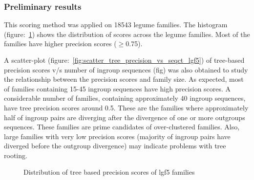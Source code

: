 \documentclass{article}
\begin{document}
		\subsubsection{Preliminary results}
		This scoring method was applied on 18543 legume families. The histogram (figure:~\ref{fig:hist_tree_precision_scores_lgf5}) shows the distribution of scores across the legume families. Most of the families have higher precision scores ($\geq$0.75).
		
		A scatter-plot (figure:~\ref{fig:scatter_tree_precision_vs_seqct_lgf5}) of tree-based precision scores v/s number of ingroup sequences (fig) was also obtained to study the relationship between the precision scores and family size. As expected, most of families containing 15-45 ingroup sequences  have high precision scores. A considerable number of families, containing approximately 40 ingroup sequences, have tree precision scores around 0.5. These are the families where approximately half of ingroup pairs are diverging after the divergence of one or more outgroups sequences. These families are prime candidates of over-clustered families. Also, large families with very low precision scores (majority of ingroup pairs have diverged before the outgroup divergence) may indicate problems with tree rooting.
		
		\begin{figure}[h!]
			\caption{Distribution of tree based precision scores of lgf5 families}
			\label{fig:hist_tree_precision_scores_lgf5}
		\end{figure}
		
\end{document}
